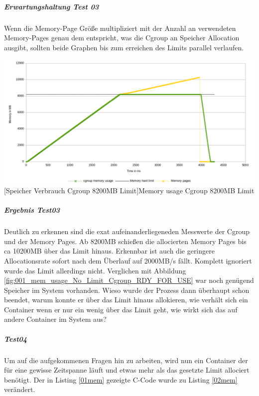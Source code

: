 \subparagraph{Erwartungshaltung Test 03}
Wenn die Memory-Page Größe multipliziert mit der Anzahl an verwendeten Memory-Pages genau dem entspricht, was die Cgroup an Speicher Allocation ausgibt, sollten beide Graphen bis zum erreichen des Limits parallel verlaufen.

\vspace{1em}
\begin{minipage}{\linewidth}
	\centering
	\includegraphics[width=1\linewidth]{pics/003_mem_usage_8200mb_limit_Cgroup_Pages_RDY_FOR_USE.png}
	[Speicher Verbrauch Cgroup 8200MB Limit]{Memory usage Cgroup 8200MB Limit}
	\label{fig:003_mem_usage_8200mb_limit_Cgroup_Pages_RDY_FOR_USE}
\end{minipage}

\subparagraph{Ergebnis Test03}
Deutlich zu erkennen sind die exat aufeinanderliegeneden Messwerte der Cgroup und der Memory Pages. Ab 8200MB schießen die allocierten Memory Pages bis ca 10200MB über das Limit hinaus. Erkennbar ist auch die geringere Allocationsrate sofort nach dem Überlauf auf 2000MB/s fällt. Komplett ignoriert wurde das Limit allerdings nicht. Verglichen mit Abbildung \ref{fig:001_mem_usage_No_Limit_Cgroup_RDY_FOR_USE} war noch genügend Speicher im System vorhanden. Wieso wurde der Prozess dann überhaupt schon beendet, warum konnte er über das Limit hinaus allokieren, wie verhält sich ein Container wenn er nur ein wenig über das Limit geht, wie wirkt sich das auf andere Container im System aus?

\subparagraph{Test04}
Um auf die aufgekommenen Fragen hin zu arbeiten, wird nun ein Container der für eine gewisse Zeitspanne läuft und etwas mehr als das gesetzte Limit allociert benötigt. Der in Listing \ref{01mem} gezeigte C-Code wurde zu Listing \ref{02mem} verändert. 

\vspace{1em}


